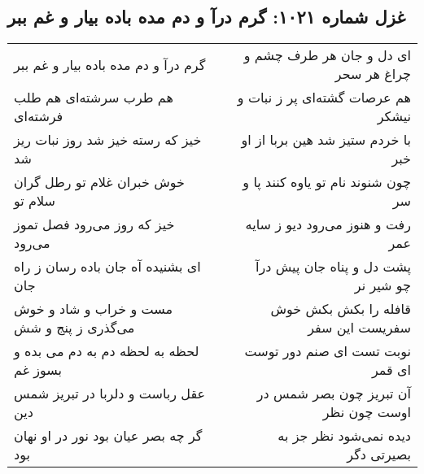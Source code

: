 \begin{center}
\section*{غزل شماره ۱۰۲۱: گرم درآ و دم مده باده بیار و غم ببر}
\label{sec:1021}
\begin{longtable}{l p{0.5cm} r}
گرم درآ و دم مده باده بیار و غم ببر
&&
ای دل و جان هر طرف چشم و چراغ هر سحر
\\
هم طرب سرشته‌ای هم طلب فرشته‌ای
&&
هم عرصات گشته‌ای پر ز نبات و نیشکر
\\
خیز که رسته خیز شد روز نبات ریز شد
&&
با خردم ستیز شد هین بربا از او خبر
\\
خوش خبران غلام تو رطل گران سلام تو
&&
چون شنوند نام تو یاوه کنند پا و سر
\\
خیز که روز می‌رود فصل تموز می‌رود
&&
رفت و هنوز می‌رود دیو ز سایه عمر
\\
ای بشنیده آه جان باده رسان ز راه جان
&&
پشت دل و پناه جان پیش درآ چو شیر نر
\\
مست و خراب و شاد و خوش می‌گذری ز پنج و شش
&&
قافله را بکش بکش خوش سفریست این سفر
\\
لحظه به لحظه دم به دم می بده و بسوز غم
&&
نوبت تست ای صنم دور توست ای قمر
\\
عقل رباست و دلربا در تبریز شمس دین
&&
آن تبریز چون بصر شمس در اوست چون نظر
\\
گر چه بصر عیان بود نور در او نهان بود
&&
دیده نمی‌شود نظر جز به بصیرتی دگر
\\
\end{longtable}
\end{center}
